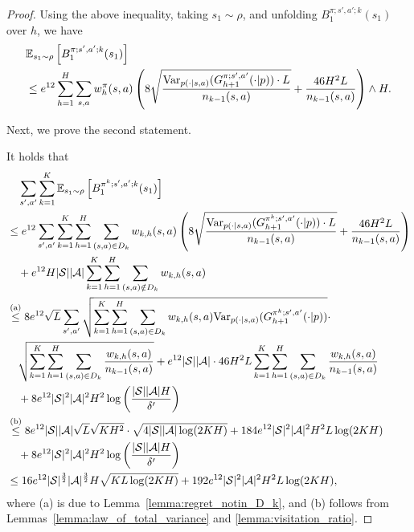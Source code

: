 \begin{proof}
	Using the above inequality, taking $s_1 \sim \rho$, and unfolding $B^{\pi;s',a';k}_1(s_1)$ over $h$, we have
	\begin{align}
		&\mathbb{E}_{s_1 \sim \rho}\left[ B^{\pi;s',a';k}_1(s_1) \right] 
		\nonumber\\
		&\leq e^{12} \sum_{h=1}^{H} \sum_{s,a}  w^{\pi}_h(s,a)  \left(  8  \sqrt{ \frac{\textup{Var}_{p(\cdot|s,a)}(G^{\pi;s',a'}_{h+1}(\cdot|p)) \cdot L}{n_{k-1}(s,a)} }  + \frac{46  H^2L}{n_{k-1}(s,a)}  \right) \wedge H . \label{eq:bound_B}
	\end{align}
	
	Next, we prove the second statement.
	
	It holds that
	\begin{align*}
		&\quad \sum_{s',a'} \sum_{k=1}^{K}  \mathbb{E}_{s_1 \sim \rho}\left[ B^{\pi^k;s',a';k}_1(s_1) \right]
		\\
		&\leq  e^{12} \sum_{s',a'} \sum_{k=1}^{K} \sum_{h=1}^{H} \sum_{(s,a) \in D_k}  w_{k,h}(s,a) \left(  8  \sqrt{ \frac{\textup{Var}_{p(\cdot|s,a)}(G^{\pi^k;s',a'}_{h+1}(\cdot|p)) \cdot L}{n_{k-1}(s,a)} }  + \frac{46  H^2L}{n_{k-1}(s,a)}  \right)
		\\&\quad + e^{12} H |\mathcal{S}| |\mathcal{A}| \sum_{k=1}^{K} \sum_{h=1}^{H} \sum_{(s,a) \notin D_k}  w_{k,h}(s,a)  
		\\
		&\overset{\textup{(a)}}{\leq}  8 e^{12} \sqrt{L} \sum_{s',a'} \sqrt{ \sum_{k=1}^{K} \sum_{h=1}^{H} \sum_{(s,a) \in D_k} w_{k,h}(s,a) \textup{Var}_{p(\cdot|s,a)}(G^{\pi^k;s',a'}_{h+1}(\cdot|p)) } \cdot 
		\\&\quad \sqrt{ \sum_{k=1}^{K} \sum_{h=1}^{H} \sum_{(s,a) \in D_k} \frac{w_{k,h}(s,a) }{n_{k-1}(s,a)} } 
		+ e^{12} |\mathcal{S}| |\mathcal{A}| \cdot 46  H^2L \sum_{k=1}^{K} \sum_{h=1}^{H} \sum_{(s,a) \in D_k}   \frac{w_{k,h}(s,a) }{n_{k-1}(s,a)} 
		\\&\quad + 8 e^{12}  |\mathcal{S}|^2 |\mathcal{A}|^2 H^2 \log\left( \frac{|\mathcal{S}||\mathcal{A}|H}{\delta'} \right)
		\\
		&\overset{\textup{(b)}}{\leq}  8 e^{12} |\mathcal{S}| |\mathcal{A}| \sqrt{L}  \sqrt{K H^2} \cdot \sqrt{ 4 |\mathcal{S}| |\mathcal{A}| \log(2KH) } 
		+ 184 e^{12} |\mathcal{S}|^2 |\mathcal{A}|^2 H^2 L \log(2KH)  \\&\quad + 8 e^{12} |\mathcal{S}|^2 |\mathcal{A}|^2 H^2 \log\left( \frac{|\mathcal{S}||\mathcal{A}|H}{\delta'} \right) 
		\\
		&\leq  16 e^{12} |\mathcal{S}|^{\frac{3}{2}} |\mathcal{A}|^{\frac{3}{2}} H \sqrt{K L \log(2KH) } 
		+ 192 e^{12} |\mathcal{S}|^2 |\mathcal{A}|^2 H^2 L \log(2KH) ,
	\end{align*}
	where (a) is due to Lemma~\ref{lemma:regret_notin_D_k}, and (b) follows from Lemmas~\ref{lemma:law_of_total_variance} and \ref{lemma:visitation_ratio}.
\end{proof}



